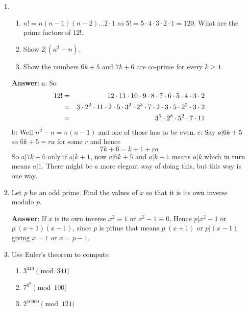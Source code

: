 \documentclass[12pt]{article}
\begin{document}
\begin{enumerate}

\item
\begin{enumerate}
\item $n!=n(n-1)(n-2)\ldots 2\cdot 1$ so $5!=5\cdot 4\cdot 3\cdot
  2\cdot 1=120$. What are the prime factors of $12!$.
\item Show $2|(n^2-n)$.
\item Show the numbers $6k+5$ and $7k+6$ are co-prime for every $k\ge 1$.
\end{enumerate}

\textbf{Answer}:
a: So
\begin{eqnarray}
12!&=&12\cdot 11\cdot 10\cdot 9\cdot 8\cdot 7\cdot 6\cdot 5\cdot 4\cdot 3\cdot 2\cr
   &=&3\cdot 2^2\cdot 11\cdot 2\cdot 5\cdot 3^2\cdot 2^3\cdot 7\cdot 2\cdot 3\cdot 5\cdot 2^2\cdot 3\cdot 2\cr
   &=&3^5\cdot 2^8\cdot 5^2\cdot 7\cdot 11
\end{eqnarray}
b: Well $n^2-n=n(n-1)$ and one of those has to be even.
c: Say $a|6k+5$ so $6k+5=ra$ for some $r$ and hence
\begin{equation}
7k+6=k+1+ra
\end{equation}
So $a|7k+6$ only if $a|k+1$, now $a|6k+5$ and $a|k+1$ means $a|k$
which in turn means $a|1$. There might be a more elegant way of doing
this, but this way is one way. 

\item Let $p$ be an odd prime. Find the values of $x$ so that it is
  its own inverse modulo $p$.

\textbf{Answer}:
If $x$ is its own inverse $x^2\equiv 1$ or $x^2-1\equiv
  0$. Hence $p|x^2-1$ or $p|(x+1)(x-1)$, since $p$ is prime that means
  $p|(x+1)$ or $p|(x-1)$ giving $x=1$ or $x=p-1$.


\item Use Euler's theorem to compute
\begin{enumerate}
\item $3^{340}\pmod{341}$
\item $7^{8^9}\pmod{100}$
\item $2^{10000}\pmod{121}$
\end{enumerate}


\end{enumerate}
\end{document}
